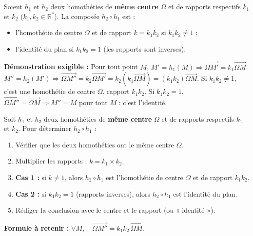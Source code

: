 \documentclass[11pt]{article}
\newcommand{\cle}[1]{{\popxbold\color{popdark}#1}}
\begin{document}
\begin{propriete}
Soient $h_1$ et $h_2$ deux homothéties de \textbf{même centre} $\Omega$ et de rapports respectifs $k_1$ et $k_2$ ($k_1, k_2 \in \mathbb{R}^*$).
La composée $h_2 \circ h_1$ est :
\begin{itemize}
\item l'\cle{homothétie} de centre $\Omega$ et de rapport $k = k_1 k_2$ si $k_1 k_2 \neq 1$ ;
\item l'\cle{identité} du plan si $k_1 k_2 = 1$ (les rapports sont inverses).
\end{itemize}
\textbf{Démonstration exigible :} Pour tout point $M$, $M' = h_1(M) \Rightarrow \overrightarrow{\Omega M'} = k_1 \overrightarrow{\Omega M}$. $M'' = h_2(M') \Rightarrow \overrightarrow{\Omega M''} = k_2 \overrightarrow{\Omega M'} = k_2(k_1 \overrightarrow{\Omega M}) = (k_1 k_2) \overrightarrow{\Omega M}$.
Si $k_1 k_2 \neq 1$, c'est une homothétie de centre $\Omega$, rapport $k_1 k_2$.
Si $k_1 k_2 = 1$, $\overrightarrow{\Omega M''} = \overrightarrow{\Omega M} \Rightarrow M''=M$ pour tout $M$ : c'est l'identité.
\end{propriete}

\begin{methode}
Soit $h_1$ et $h_2$ deux homothéties de \textbf{même centre} $\Omega$ et de rapports respectifs $k_1$ et $k_2$. Pour déterminer $h_2 \circ h_1$ :
\begin{enumerate}
\item Vérifier que les deux homothéties ont le même centre $\Omega$.
\item Multiplier les rapports : $k = k_1 \times k_2$.
\item \textbf{Cas 1 :} si $k \neq 1$, alors $h_2 \circ h_1$ est l'\cle{homothétie} de centre $\Omega$ et de rapport $k_1 k_2$.
\item \textbf{Cas 2 :} si $k_1 k_2 = 1$ (rapports inverses), alors $h_2 \circ h_1$ est l'\cle{identité} du plan.
\item Rédiger la conclusion avec le centre et le rapport (ou « identité »).
\end{enumerate}
\textbf{Formule à retenir :} $\forall M,\quad \overrightarrow{\Omega M''} = k_1 k_2 \, \overrightarrow{\Omega M}$.
\end{methode}
\end{document}
